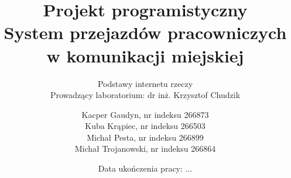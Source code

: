 \documentclass[10pt, a4paper, titlepage]{article}
\title{
  Projekt programistyczny \\
  System przejazdów pracowniczych w komunikacji miejskiej
}
\subtitle{
  Podstawy internetu rzeczy \\
  Prowadzący laboratorium: dr inż. Krzysztof Chudzik
}
\author{
  Kacper Gaudyn, nr indeksu 266873 \\
  Kuba Krąpiec, nr indeksu 266503 \\
  Michał Pesta, nr indeksu 266899 \\
  Michał Trojanowski, nr indeksu 266864
}
\date{Data ukończenia pracy: ...}
\begin{document}
  \begin{titlingpage}
    \maketitle
  \end{titlingpage}
  \tableofcontents

  \newpage
  
  
  
  
\end{document}
